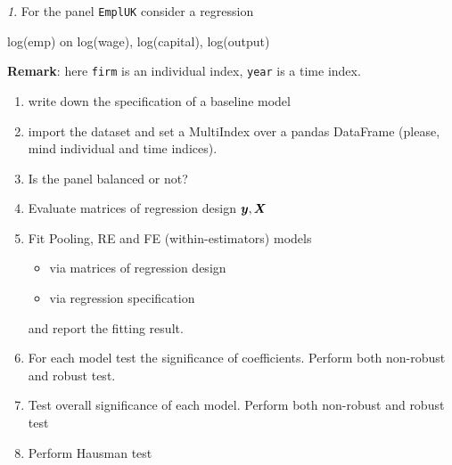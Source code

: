 \documentclass[12pt]{article}
\theoremstyle{remark}
\newtheorem{exercise}{}[section]
\begin{document}
\begin{exercise}
For the panel \texttt{EmplUK} consider a regression
\begin{center}
	log(emp) on log(wage), log(capital), log(output) 
\end{center}
\textbf{Remark}: here \texttt{firm} is an individual index, 
\texttt{year} is a time index.
\begin{enumerate}
	\item write down the specification of a baseline model
	\item import the dataset and set a MultiIndex over a pandas DataFrame 
	(please, mind  individual and time indices).
	\item Is the panel balanced or not?
	\item Evaluate matrices of regression design \({\bm y}, {\bm X}\)
	\item Fit Pooling, RE and FE (within-estimators) models
	\begin{itemize}
		\item via matrices of regression design
		\item via regression specification
	\end{itemize}
	and report the fitting result.
	\item For each model test the significance of coefficients. Perform both
	non-robust and robust test.
	\item Test overall significance of each model. Perform both
	non-robust and robust test
	\item Perform Hausman test
\end{enumerate}
\end{exercise}
\end{document}
